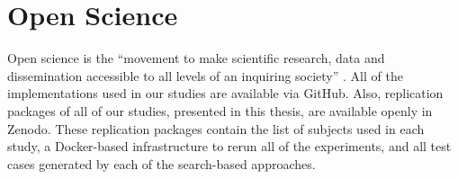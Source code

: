 \section{Open Science}

Open science is the “movement to make scientific research, data and dissemination accessible to all levels of an inquiring society” \cite{Open_science}. All of the implementations used in our studies are available via GitHub. Also, replication packages of all of our studies, presented in this thesis, are available openly in Zenodo. These replication packages contain the list of subjects used in each study, a Docker-based infrastructure to rerun all of the experiments, and all test cases generated by each of the search-based approaches.












